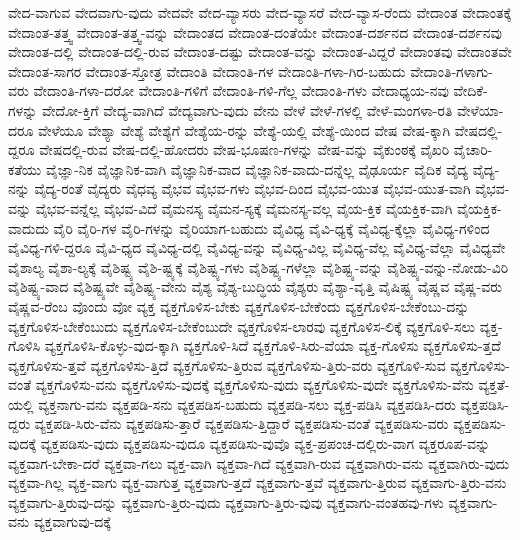 {ವೇದ-ವಾಗುವ
ವೇದವಾಗು-ವುದು
ವೇದವೇ
ವೇದ-ವ್ಯಾಸರು
ವೇದ-ವ್ಯಾಸರೆ
ವೇದ-ವ್ಯಾಸ-ರೆಂದು
ವೇದಾಂತ
ವೇದಾಂತಕ್ಕೆ
ವೇದಾಂತ-ತತ್ತ್ವ
ವೇದಾಂತ-ತತ್ತ್ವ-ವನ್ನು
ವೇದಾಂತದ
ವೇದಾಂತ-ದಂತೆಯೇ
ವೇದಾಂತ-ದರ್ಶನದ
ವೇದಾಂತ-ದರ್ಶನವು
ವೇದಾಂತ-ದಲ್ಲಿ
ವೇದಾಂತ-ದಲ್ಲಿ-ರುವ
ವೇದಾಂತ-ದಷ್ಟು
ವೇದಾಂತ-ವನ್ನು
ವೇದಾಂತ-ವಿದ್ದರೆ
ವೇದಾಂತವು
ವೇದಾಂತವೇ
ವೇದಾಂತ-ಸಾಗರ
ವೇದಾಂತ-ಸ್ತೋತ್ರ
ವೇದಾಂತಿ
ವೇದಾಂತಿ-ಗಳ
ವೇದಾಂತಿ-ಗಳಾ-ಗಿರ-ಬಹುದು
ವೇದಾಂತಿ-ಗಳಾಗು-ವರು
ವೇದಾಂತಿ-ಗಳಾ-ದರೋ
ವೇದಾಂತಿ-ಗಳಿಗೆ
ವೇದಾಂತಿ-ಗಳಿ-ಗೆಲ್ಲ
ವೇದಾಂತಿ-ಗಳು
ವೇದಾಧ್ಯಯ-ನವು
ವೇದಿಕೆ-ಗಳನ್ನು
ವೇದೋ-ಕ್ತಿಗೆ
ವೇದ್ಯ-ವಾಗಿದೆ
ವೇದ್ಯವಾಗು-ವುದು
ವೇನು
ವೇಳೆ
ವೇಳೆ-ಗಳಲ್ಲಿ
ವೇಳೆ-ಮಂಗಳಾ-ರತಿ
ವೇಳೆಯಾ-ದರೂ
ವೇಳೆಯೂ
ವೇಶ್ಯಾ
ವೇಶ್ಯೆ
ವೇಶ್ಯೆಗೆ
ವೇಶ್ಯೆಯ-ರನ್ನು
ವೇಶ್ಯೆ-ಯಲ್ಲಿ
ವೇಶ್ಯೆ-ಯಿಂದ
ವೇಷ
ವೇಷ-ಕ್ಕಾಗಿ
ವೇಷದಲ್ಲಿ-ದ್ದರೂ
ವೇಷದಲ್ಲಿ-ರುವ
ವೇಷ-ದಲ್ಲಿ-ಹೋದರು
ವೇಷ-ಭೂಷಣ-ಗಳನ್ನು
ವೇಷ-ವನ್ನು
ವೈಕುಂಠಕ್ಕೆ
ವೈಖರಿ
ವೈಚಾರಿ-ಕತೆಯು
ವೈಜ್ಞಾ-ನಿಕ
ವೈಜ್ಞಾನಿಕ-ವಾಗಿ
ವೈಜ್ಞಾನಿಕ-ವಾದ
ವೈಜ್ಞಾನಿಕ-ವಾದು-ದನ್ನೆಲ್ಲ
ವೈಢೂರ್ಯ
ವೈದಿಕ
ವೈದ್ಯ
ವೈದ್ಯ-ನನ್ನು
ವೈದ್ಯ-ರಂತೆ
ವೈದ್ಯರು
ವೈಧವ್ಯ
ವೈಭವ
ವೈಭವ-ಗಳು
ವೈಭವ-ದಿಂದ
ವೈಭವ-ಯುತ
ವೈಭವ-ಯುತ-ವಾಗಿ
ವೈಭವ-ವನ್ನು
ವೈಭವ-ವನ್ನೆಲ್ಲ
ವೈಭವ-ವಿದೆ
ವೈಮನಸ್ಯ
ವೈಮನ-ಸ್ಯಕ್ಕೆ
ವೈಮನಸ್ಯ-ವಲ್ಲ
ವೈಯ-ಕ್ತಿಕ
ವೈಯಕ್ತಿಕ-ವಾಗಿ
ವೈಯಕ್ತಿಕ-ವಾದುದು
ವೈರಿ
ವೈರಿ-ಗಳ
ವೈರಿ-ಗಳನ್ನು
ವೈರಿಯಾಗ-ಬಹುದು
ವೈವಿಧ್ಯ
ವೈವಿ-ಧ್ಯಕ್ಕೆ
ವೈವಿಧ್ಯ-ಕ್ಕೆಲ್ಲಾ
ವೈವಿಧ್ಯ-ಗಳಿಂದ
ವೈವಿಧ್ಯ-ಗಳಿ-ದ್ದರೂ
ವೈವಿ-ಧ್ಯದ
ವೈವಿಧ್ಯ-ದಲ್ಲಿ
ವೈವಿಧ್ಯ-ವನ್ನು
ವೈವಿಧ್ಯ-ವಿಲ್ಲ
ವೈವಿಧ್ಯ-ವೆಲ್ಲ
ವೈವಿಧ್ಯ-ವೆಲ್ಲಾ
ವೈವಿಧ್ಯವೇ
ವೈಶಾಲ್ಯ
ವೈಶಾ-ಲ್ಯಕ್ಕೆ
ವೈಶಿಷ್ಟ್ಯ
ವೈಶಿ-ಷ್ಟ್ಯಕ್ಕೆ
ವೈಶಿಷ್ಟ್ಯ-ಗಳು
ವೈಶಿಷ್ಟ್ಯ-ಗಳೆಲ್ಲಾ
ವೈಶಿಷ್ಟ್ಯ-ವನ್ನು
ವೈಶಿಷ್ಟ್ಯ-ವನ್ನು-ನೋಡು-ವಿರಿ
ವೈಶಿಷ್ಟ್ಯ-ವಾದ
ವೈಶಿಷ್ಟ್ಯವೇ
ವೈಶಿಷ್ಟ್ಯ-ವೇನು
ವೈಶ್ಯ
ವೈಶ್ಯ-ಬುದ್ಧಿಯ
ವೈಶ್ಯರು
ವೈಶ್ಯಾ-ವೃತ್ತಿ
ವೈಷಿಷ್ಟ್ಯ
ವೈಷ್ಣವ
ವೈಷ್ಣ-ವರು
ವೈಷ್ಣವ-ರೆಂಬ
ವೊಂದು
ವೋ
ವ್ಯಕ್ತ
ವ್ಯಕ್ತಗೊಳಿಸ-ಬೇಕು
ವ್ಯಕ್ತಗೊಳಿಸ-ಬೇಕೆಂದು
ವ್ಯಕ್ತಗೊಳಿಸ-ಬೇಕೆಂಬು-ದನ್ನು
ವ್ಯಕ್ತಗೊಳಿಸ-ಬೇಕೆಂಬುದು
ವ್ಯಕ್ತಗೊಳಿಸ-ಬೇಕೆಂಬುದೇ
ವ್ಯಕ್ತಗೊಳಿಸ-ಲಾರವು
ವ್ಯಕ್ತಗೊಳಿಸ-ಲಿಕ್ಕೆ
ವ್ಯಕ್ತಗೊಳಿ-ಸಲು
ವ್ಯಕ್ತ-ಗೊಳಿಸಿ
ವ್ಯಕ್ತಗೊಳಿಸಿ-ಕೊಳ್ಳು-ವುದ-ಕ್ಕಾಗಿ
ವ್ಯಕ್ತಗೊಳಿ-ಸಿದೆ
ವ್ಯಕ್ತಗೊಳಿ-ಸಿರು-ವೆಯಾ
ವ್ಯಕ್ತ-ಗೊಳಿಸು
ವ್ಯಕ್ತಗೊಳಿಸು-ತ್ತದೆ
ವ್ಯಕ್ತಗೊಳಿಸು-ತ್ತವೆ
ವ್ಯಕ್ತಗೊಳಿಸು-ತ್ತಿದೆ
ವ್ಯಕ್ತಗೊಳಿಸು-ತ್ತಿರುವ
ವ್ಯಕ್ತಗೊಳಿಸು-ತ್ತಿರು-ವರು
ವ್ಯಕ್ತಗೊಳಿ-ಸುವ
ವ್ಯಕ್ತಗೊಳಿಸು-ವಂತೆ
ವ್ಯಕ್ತಗೊಳಿಸು-ವನು
ವ್ಯಕ್ತಗೊಳಿಸು-ವುದಕ್ಕೆ
ವ್ಯಕ್ತಗೊಳಿಸು-ವುದು
ವ್ಯಕ್ತಗೊಳಿಸು-ವುದೇ
ವ್ಯಕ್ತಗೊಳಿಸು-ವೆನು
ವ್ಯಕ್ತತೆ-ಯಲ್ಲಿ
ವ್ಯಕ್ತನಾಗು-ವನು
ವ್ಯಕ್ತಪಡಿ-ಸನು
ವ್ಯಕ್ತಪಡಿಸ-ಬಹುದು
ವ್ಯಕ್ತಪಡಿ-ಸಲು
ವ್ಯಕ್ತ-ಪಡಿಸಿ
ವ್ಯಕ್ತಪಡಿಸಿ-ದರು
ವ್ಯಕ್ತಪಡಿಸಿ-ದ್ದರು
ವ್ಯಕ್ತಪಡಿ-ಸಿರು-ವೆನು
ವ್ಯಕ್ತಪಡಿಸು-ತ್ತಾರೆ
ವ್ಯಕ್ತಪಡಿಸು-ತ್ತಿದ್ದಾರೆ
ವ್ಯಕ್ತಪಡಿಸು-ವಂತೆ
ವ್ಯಕ್ತಪಡಿಸು-ವರು
ವ್ಯಕ್ತಪಡಿಸು-ವುದಕ್ಕೆ
ವ್ಯಕ್ತಪಡಿಸು-ವುದು
ವ್ಯಕ್ತಪಡಿಸು-ವುದೂ
ವ್ಯಕ್ತಪಡಿಸು-ವುವೊ
ವ್ಯಕ್ತ-ಪ್ರಪಂಚ-ದಲ್ಲಿರು-ವಾಗ
ವ್ಯಕ್ತರೂಪ-ವನ್ನು
ವ್ಯಕ್ತವಾಗ-ಬೇಕಾ-ದರೆ
ವ್ಯಕ್ತವಾ-ಗಲು
ವ್ಯಕ್ತ-ವಾಗಿ
ವ್ಯಕ್ತವಾ-ಗಿದೆ
ವ್ಯಕ್ತವಾಗಿ-ರುವ
ವ್ಯಕ್ತವಾಗಿರು-ವನು
ವ್ಯಕ್ತವಾಗಿರು-ವುದು
ವ್ಯಕ್ತವಾ-ಗಿಲ್ಲ
ವ್ಯಕ್ತ-ವಾಗು
ವ್ಯಕ್ತ-ವಾಗುತ್ತ
ವ್ಯಕ್ತವಾಗು-ತ್ತದೆ
ವ್ಯಕ್ತವಾಗು-ತ್ತವೆ
ವ್ಯಕ್ತವಾಗು-ತ್ತಿರುವ
ವ್ಯಕ್ತವಾಗು-ತ್ತಿರು-ವನು
ವ್ಯಕ್ತವಾಗು-ತ್ತಿರುವು-ದನ್ನು
ವ್ಯಕ್ತವಾಗು-ತ್ತಿರು-ವುದು
ವ್ಯಕ್ತವಾಗು-ತ್ತಿರು-ವುವು
ವ್ಯಕ್ತವಾಗು-ವಂತಹವು-ಗಳು
ವ್ಯಕ್ತವಾಗು-ವನು
ವ್ಯಕ್ತವಾಗುವು-ದಕ್ಕೆ
}
